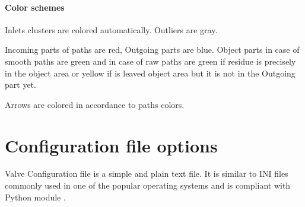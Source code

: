 \documentclass[a4paper,10pt,english]{sphinxmanual}
\begin{document}
\subsubsection{Color schemes}
\label{valve/valve_manual:color-schemes}
Inlets clusters are colored automatically. Outliers are gray.

Incoming parts of paths are red, Outgoing parts are blue. Object parts in case of smooth paths are green and in case of raw paths are green if residue is precisely in the object area or yellow if is leaved object area but it is not in the Outgoing part yet.

Arrows are colored in accordance to paths colors.


\chapter{Configuration file options}
\label{valve/valve_config::doc}\label{valve/valve_config:configuration-file-options}
Valve Configuration file is a simple and plain text file. It is similar to INI files commonly used in one of the popular operating systems and is compliant with Python module \href{http://docs.python.org/2/library/configparser.html\#module-ConfigParser}{}.
\end{document}
